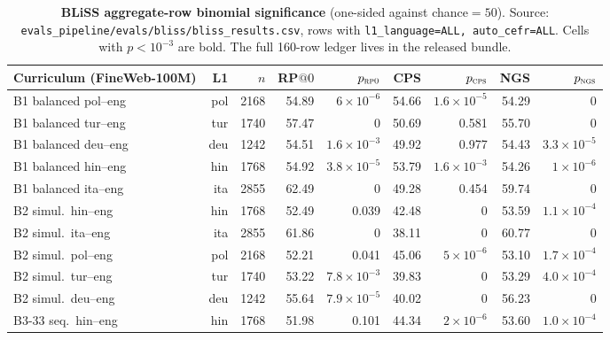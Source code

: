 \begin{table}[!ht]
  \centering
  \small
  \caption{\textbf{BLiSS aggregate-row binomial significance} (one-sided against chance$=50$). Source: \texttt{evals\_pipeline/evals/bliss/bliss\_results.csv}, rows with \texttt{l1\_language=ALL, auto\_cefr=ALL}. Cells with $p < 10^{-3}$ are bold. The full 160-row ledger lives in the released bundle.}
  \label{tab:sig_bliss_examples}
  \begin{tabular}{lrrrrrrrr}
    \toprule
    Curriculum (FineWeb-100M) & L1 & $n$ & RP$@0$ & $p_\textsc{rp0}$ & CPS & $p_\textsc{cps}$ & NGS & $p_\textsc{ngs}$ \\
    \midrule
    B1 balanced pol--eng        & pol & 2168 & 54.89 & \textbf{$6{\times}10^{-6}$}   & 54.66 & \textbf{$1.6{\times}10^{-5}$} & 54.29 & \textbf{$0$} \\
    B1 balanced tur--eng        & tur & 1740 & 57.47 & \textbf{$0$}                  & 50.69 & 0.581 & 55.70 & \textbf{$0$} \\
    B1 balanced deu--eng        & deu & 1242 & 54.51 & \textbf{$1.6{\times}10^{-3}$} & 49.92 & 0.977 & 54.43 & \textbf{$3.3{\times}10^{-5}$} \\
    B1 balanced hin--eng        & hin & 1768 & 54.92 & \textbf{$3.8{\times}10^{-5}$} & 53.79 & \textbf{$1.6{\times}10^{-3}$} & 54.26 & \textbf{$1{\times}10^{-6}$} \\
    B1 balanced ita--eng        & ita & 2855 & 62.49 & \textbf{$0$}                  & 49.28 & 0.454 & 59.74 & \textbf{$0$} \\
    B2 simul.\ hin--eng         & hin & 1768 & 52.49 & 0.039                          & 42.48 & \textbf{$0$} & 53.59 & \textbf{$1.1{\times}10^{-4}$} \\
    B2 simul.\ ita--eng         & ita & 2855 & 61.86 & \textbf{$0$}                  & 38.11 & \textbf{$0$} & 60.77 & \textbf{$0$} \\
    B2 simul.\ pol--eng         & pol & 2168 & 52.21 & 0.041                          & 45.06 & \textbf{$5{\times}10^{-6}$} & 53.10 & \textbf{$1.7{\times}10^{-4}$} \\
    B2 simul.\ tur--eng         & tur & 1740 & 53.22 & \textbf{$7.8{\times}10^{-3}$} & 39.83 & \textbf{$0$} & 53.29 & \textbf{$4.0{\times}10^{-4}$} \\
    B2 simul.\ deu--eng         & deu & 1242 & 55.64 & \textbf{$7.9{\times}10^{-5}$} & 40.02 & \textbf{$0$} & 56.23 & \textbf{$0$} \\
    B3-33 seq.\ hin--eng        & hin & 1768 & 51.98 & 0.101                          & 44.34 & \textbf{$2{\times}10^{-6}$} & 53.60 & \textbf{$1.0{\times}10^{-4}$} \\

\end{tabular}
\end{table}
